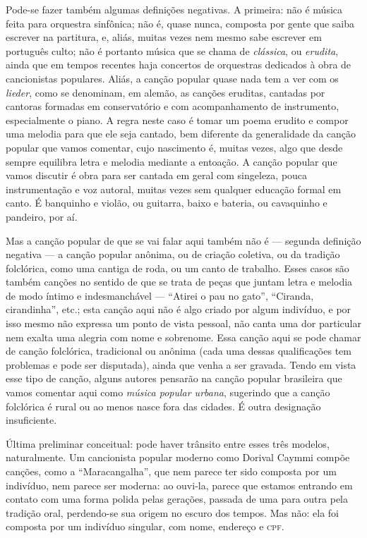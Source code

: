Pode-se fazer também algumas definições negativas. A primeira: 
não é música feita para orquestra sinfônica; não é, quase
nunca, composta por gente que saiba escrever na partitura, e, aliás,
muitas vezes nem mesmo sabe escrever em português culto; não é portanto
música que se chama de \textit{clássica}, ou \textit{erudita}, ainda que em tempos
recentes haja concertos de orquestras dedicados à obra de cancionistas
populares. Aliás, a canção popular quase nada tem a ver com os
\textit{lieder}, como se denominam, em alemão, as canções eruditas, cantadas
por cantoras formadas em conservatório e com acompanhamento de
instrumento, especialmente o piano. A regra neste caso é tomar
um poema erudito e compor uma melodia para que ele seja cantado, bem
diferente da generalidade da canção popular que vamos comentar, cujo
nascimento é, muitas vezes, algo que desde sempre equilibra letra e
melodia mediante a entoação. A canção popular que vamos discutir é obra
para ser cantada em geral com singeleza, pouca instrumentação e voz
autoral, muitas vezes sem qualquer educação formal em canto. É banquinho
e violão, ou guitarra, baixo e bateria, ou cavaquinho e pandeiro, por
aí.

Mas a canção popular de que se vai falar aqui também não é --- segunda
definição negativa --- a canção popular anônima, ou de criação coletiva,
ou da tradição folclórica, como uma cantiga de roda, ou um canto de
trabalho. Esses casos são também canções no sentido de que se trata de
peças que juntam letra e melodia de modo íntimo e indesmanchável ---
``Atirei o pau no gato'', ``Ciranda, cirandinha'', etc.; esta canção aqui não é
algo criado por algum indivíduo, e por isso mesmo não expressa um ponto
de vista pessoal, não canta uma dor particular nem exalta uma alegria
com nome e sobrenome. Essa canção aqui se pode chamar de canção
folclórica, tradicional ou anônima (cada uma dessas qualificações
tem problemas e pode ser disputada), ainda que venha a ser gravada.
Tendo em vista esse tipo de canção, alguns autores pensarão na canção
popular brasileira que vamos comentar aqui como \textit{música popular
urbana}, sugerindo que a canção folclórica é rural ou ao menos nasce
fora das cidades. É outra designação insuficiente.

Última preliminar conceitual: pode haver trânsito entre esses três
modelos, naturalmente. Um cancionista popular moderno como Dorival
Caymmi compõe canções, como a ``Maracangalha'', que nem parece ter sido
composta por um indivíduo, nem parece ser moderna: ao ouvi-la, parece
que estamos entrando em contato com uma forma polida pelas gerações,
passada de uma para outra pela tradição oral, perdendo-se sua origem no
escuro dos tempos. Mas não: ela foi composta por um indivíduo singular,
com nome, endereço e \textsc{cpf}.

